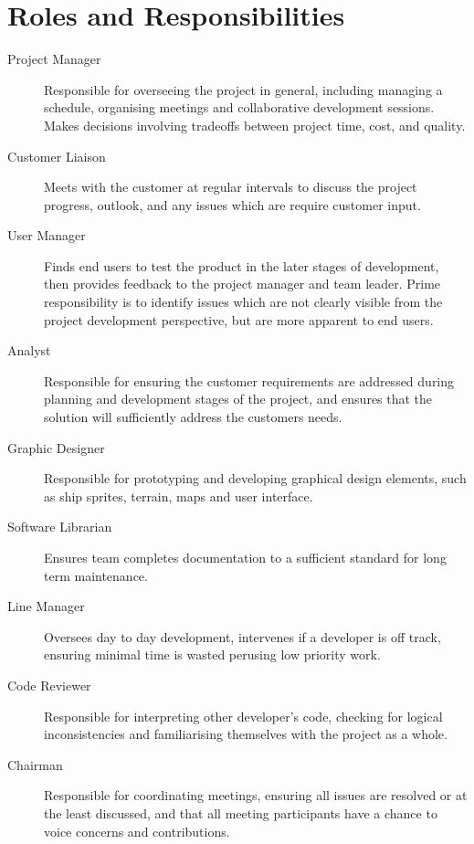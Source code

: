 \section{Roles and Responsibilities}
\label{section:roles}

\begin{description}
    \item[Project Manager] Responsible for overseeing the project in general, including managing a schedule, organising meetings and collaborative development sessions. Makes decisions involving tradeoffs between project time, cost, and quality. 
     
    \item[Customer Liaison] Meets with the customer at regular intervals to discuss the project progress, outlook, and any issues which are require customer input.
     
    \item[User Manager] Finds end users to test the product in the later stages of development, then provides feedback to the project manager and team leader. Prime responsibility is to identify issues which are not clearly visible from the project development perspective, but are more apparent to end users.
     
    \item[Analyst] Responsible for ensuring the customer requirements are addressed during planning and development stages of the project, and ensures that the solution will sufficiently address the customers needs.
     
    \item[Graphic Designer] Responsible for prototyping and developing graphical design elements, such as ship sprites, terrain, maps and user interface.
     
    \item[Software Librarian] Ensures team completes documentation to a sufficient standard for long term maintenance. 
     
    \item[Line Manager] Oversees day to day development, intervenes if a developer is off track, ensuring minimal time is wasted perusing low priority work.
     
    \item[Code Reviewer] Responsible for interpreting other developer's code, checking for logical inconsistencies and familiarising themselves with the project as a whole.
     
    \item[Chairman] Responsible for coordinating meetings, ensuring all issues are resolved or at the least discussed, and that all meeting participants have a chance to voice concerns and contributions.
     

\end{description}
